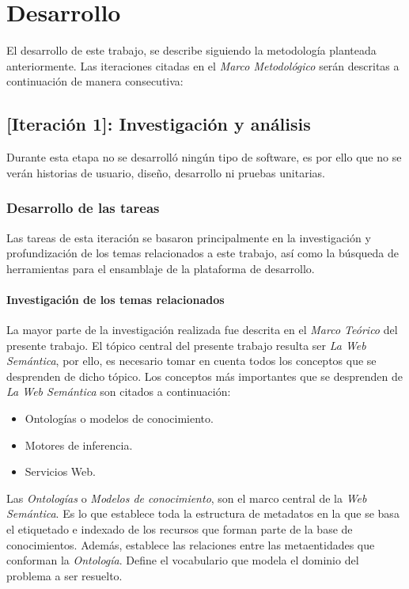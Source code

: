 \chapter{Desarrollo}
\label{chap:desarrollo}

El desarrollo de este trabajo, se describe siguiendo la metodología planteada anteriormente. Las iteraciones citadas en el \textit{Marco Metodológico} serán descritas a continuación de manera consecutiva:

\section{[Iteración 1]: Investigación y análisis}
Durante esta etapa no se desarrolló ningún tipo de software, es por ello que no se verán historias de usuario, diseño, desarrollo ni pruebas unitarias.

\subsection{Desarrollo de las tareas}
Las tareas de esta iteración se basaron principalmente en la investigación y profundización de los temas relacionados a este trabajo, así como la búsqueda de herramientas para el ensamblaje de la plataforma de desarrollo.

\subsubsection{Investigación de los temas relacionados}
La mayor parte de la investigación realizada fue descrita en el \textit{Marco Teórico} del presente trabajo. El tópico central del presente trabajo resulta ser \textit{La Web Semántica}, por ello, es necesario tomar en cuenta todos los conceptos que se desprenden de dicho tópico. Los conceptos más importantes que se desprenden de \textit{La Web Semántica} son citados a continuación:

\begin{itemize}
\item Ontologías o modelos de conocimiento.
\item Motores de inferencia.
\item Servicios Web.
\end{itemize}

Las \textit{Ontologías} o \textit{Modelos de conocimiento}, son el marco central de la \textit{Web Semántica}. Es lo que establece toda la estructura de metadatos en la que se basa el etiquetado e indexado de los recursos que forman parte de la base de conocimientos. Además, establece las relaciones entre las metaentidades que conforman la \textit{Ontología}. Define el vocabulario que modela el dominio del problema a ser resuelto.

